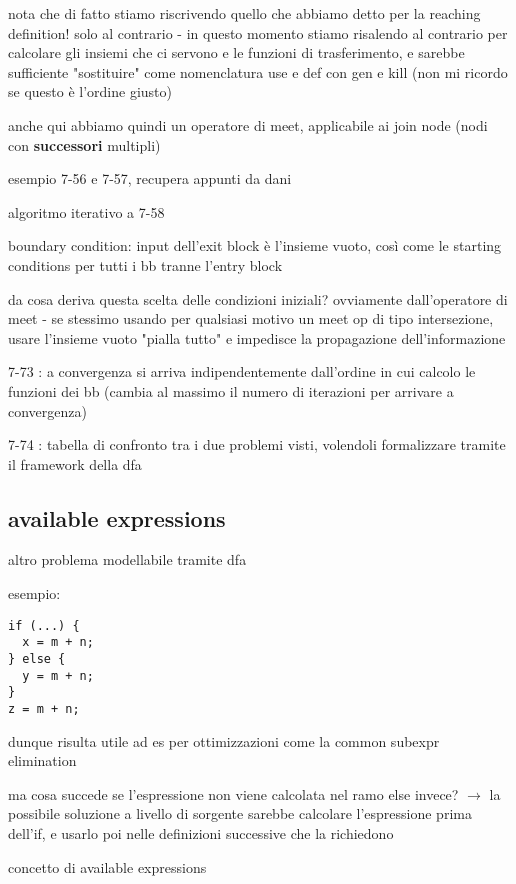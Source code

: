 \begin{emphasize}
    nota che di fatto stiamo riscrivendo quello che abbiamo detto per la reaching definition! solo al contrario - in questo momento stiamo risalendo al contrario per calcolare gli insiemi che ci servono e le funzioni di trasferimento, e sarebbe sufficiente "sostituire" come nomenclatura use e def con gen e kill (non mi ricordo se questo \`e l'ordine giusto)
\end{emphasize}

anche qui abbiamo quindi un operatore di meet, applicabile ai join node (nodi con \textbf{successori} multipli)

esempio 7-56 e 7-57, recupera appunti da dani

algoritmo iterativo a 7-58

boundary condition: input dell'exit block \`e l'insieme vuoto, cos\`i come le starting conditions per tutti i bb tranne l'entry block

da cosa deriva questa scelta delle condizioni iniziali? ovviamente dall'operatore di meet - se stessimo usando per qualsiasi motivo un meet op di tipo intersezione, usare l'insieme vuoto "pialla tutto" e impedisce la propagazione dell'informazione

7-73 : a convergenza si arriva indipendentemente dall'ordine in cui calcolo le funzioni dei bb (cambia al massimo il numero di iterazioni per arrivare a convergenza)

7-74 : tabella di confronto tra i due problemi visti, volendoli formalizzare tramite il framework della dfa

\subsection{available expressions}

altro problema modellabile tramite dfa

esempio:
\begin{lstlisting}
if (...) {
  x = m + n;
} else {
  y = m + n;
}
z = m + n;\end{lstlisting}

dunque risulta utile ad es per ottimizzazioni come la common subexpr elimination

ma cosa succede se l'espressione non viene calcolata nel ramo else invece? $\rightarrow$ la possibile soluzione a livello di sorgente sarebbe calcolare l'espressione prima dell'if, e usarlo poi nelle definizioni successive che la richiedono

concetto di available expressions

